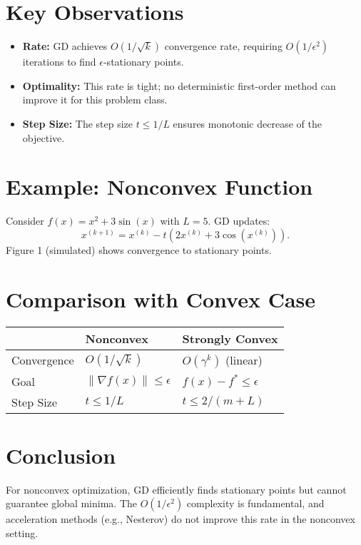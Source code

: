 \documentclass{article}
\begin{document}
\section{Key Observations}
\begin{itemize}
\item \textbf{Rate:} GD achieves $O(1/\sqrt{k})$ convergence rate, requiring $O(1/\epsilon^2)$ iterations to find $\epsilon$-stationary points.
\item \textbf{Optimality:} This rate is tight; no deterministic first-order method can improve it for this problem class.
\item \textbf{Step Size:} The step size $t \leq 1/L$ ensures monotonic decrease of the objective.
\end{itemize}

\section{Example: Nonconvex Function}
Consider $f(x) = x^2 + 3\sin(x)$ with $L=5$. GD updates:
\[
x^{(k+1)} = x^{(k)} - t(2x^{(k)} + 3\cos(x^{(k)})).
\]
Figure 1 (simulated) shows convergence to stationary points.

\section{Comparison with Convex Case}
\begin{tabular}{|l|l|l|}
\hline
 & \textbf{Nonconvex} & \textbf{Strongly Convex} \\
\hline
Convergence & $O(1/\sqrt{k})$ & $O(\gamma^k)$ (linear) \\
Goal & $\|\nabla f(x)\| \leq \epsilon$ & $f(x) - f^* \leq \epsilon$ \\
Step Size & $t \leq 1/L$ & $t \leq 2/(m + L)$ \\
\hline
\end{tabular}

\section{Conclusion}
For nonconvex optimization, GD efficiently finds stationary points but cannot guarantee global minima. The $O(1/\epsilon^2)$ complexity is fundamental, and acceleration methods (e.g., Nesterov) do not improve this rate in the nonconvex setting.
\end{document}
